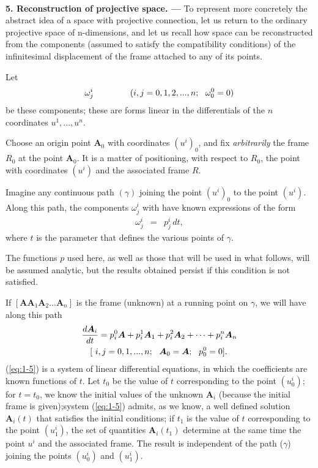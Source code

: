 
\ \\

{\bf 5. Reconstruction of projective space. --- }
% 
To represent more concretely the abstract idea of a space with projective connection, let us return to the ordinary projective space of n-dimensions, and let us recall how space can be reconstructed from the components (assumed to satisfy the compatibility conditions) of the infinitesimal displacement of the frame attached to any of its points.

Let 
\begin{eqnarray*}
\omega^i_j \hspace*{1.5cm} (i,j = 0,1,2,...,n; \ \ \omega^0_0 = 0 )
\end{eqnarray*}
be these components; these are forms linear in the differentials of the $n$ coordinates $u^1, ..., u^n$.

Choose an origin point $\bm A_0$ with coordinates $(u^i)_0$, and fix {\em arbitrarily} the frame $R_0$ at the point $\bm A_0$. It is a matter of positioning, with respect to $R_0$, the point with coordinates $(u^i)$ and the associated frame $R$.

Imagine any continuous path $(\gamma)$ joining the point $(u^i)_0$ to the point $(u^i)$. Along this path, the components $\omega^i_j$ with have known expressions of the form 
\begin{eqnarray*}
\omega^i_j &=& p^i_j \, dt, 
\end{eqnarray*}
where $t$ is the parameter that defines the various points of $\gamma$.

The functions $p$ used here, as well as those that will be used in what follows, will be assumed analytic, but the results obtained persist if this condition is not satisfied. 

If $[\bm A \bm A_1 \bm A_2...\bm A_n]$ is the frame (unknown) at a running point on $\gamma$, we will have along this path
\begin{eqnarray}
\frac{d\bm A_i}{dt} = p_i^0 \bm A + p_i^1 \bm A_1 + p_i^2 \bm A_2 + \cdots + p_i^n \bm A_n 
\label{eq:1-5}  \\
\ [ \ i,j = 0,1,...,n; \ \ \bm A_0 = \bm A;\ \ p^0_0 = 0 ]. \hspace*{.4cm}
\nonumber
\end{eqnarray}
(\ref{eq:1-5}) is a system of linear differential equations, in which the coefficients are known functions of $t$. Let $t_0$ be the value of $t$ corresponding to the point $(u^i_0)$; for $t=t_0$, we know the initial values of the unknown $\bm A_i$ (because the initial frame is given);system (\ref{eq:1-5}) admits, as we know, a well defined solution $\bm A_i(t)$ that satisfies the initial conditions; if $t_1$ is the value of $t$ corresponding to the point $(u^i_1)$, the set of quantities $\bm A_i(t_1)$ determine at the same time the point $u^i$ and the associated frame. The result is independent of the path ($\gamma$) joining the points $(u^i_0)$ and $(u^i_1)$.

